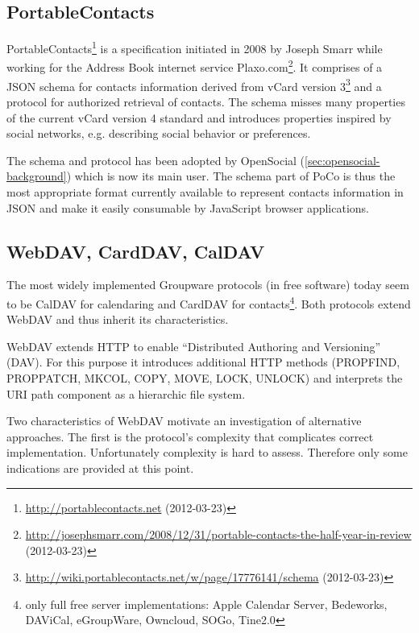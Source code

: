 \documentclass[11pt,a4paper,headsepline,twoside]{scrartcl}		%
\newcommand{\citeurl}[2]{\url{#1} (#2)}
\begin{document}
\subsection{PortableContacts}
\label{sec:portablecontacts}

PortableContacts\footnote{\citeurl{http://portablecontacts.net}{2012-03-23}} is
a specification initiated in 2008 by Joseph Smarr while working for the Address
Book internet service
Plaxo.com\footnote{\citeurl{http://josephsmarr.com/2008/12/31/portable-contacts-the-half-year-in-review}{2012-03-23}}. It
comprises of a JSON schema for contacts information derived from vCard version
3\footnote{\citeurl{http://wiki.portablecontacts.net/w/page/17776141/schema}{2012-03-23}}
and a protocol for authorized retrieval of contacts. The schema misses many
properties of the current vCard version 4 standard \cite{RFC6350} and introduces
properties inspired by social networks, e.g. describing social behavior or
preferences.

The schema and protocol has been adopted by OpenSocial
(\autoref{sec:opensocial-background}) which is now its main user. The schema
part of PoCo is thus the most appropriate format currently available to
represent contacts information in JSON and make it easily consumable by
JavaScript browser applications.

\subsection{WebDAV, CardDAV, CalDAV}
\label{sec:carddav-caldav}

The most widely implemented Groupware protocols (in free software) today seem to
be CalDAV \cite{RFC4791} for calendaring and CardDAV \cite{RFC6352} for
contacts\footnote{only full free server implementations: Apple Calendar Server,
  Bedeworks, DAViCal, eGroupWare, Owncloud, SOGo, Tine2.0}. Both protocols
extend WebDAV \cite{RFC4918} and thus inherit its characteristics.

WebDAV extends HTTP to enable ``Distributed Authoring and Versioning''
(DAV). For this purpose it introduces additional HTTP methods (PROPFIND,
PROPPATCH, MKCOL, COPY, MOVE, LOCK, UNLOCK) and interprets the URI path
component as a hierarchic file system.

Two characteristics of WebDAV motivate an investigation of alternative
approaches. The first is the protocol's complexity that complicates correct
implementation. Unfortunately complexity is hard to assess. Therefore only some
indications are provided at this point.
\end{document}
